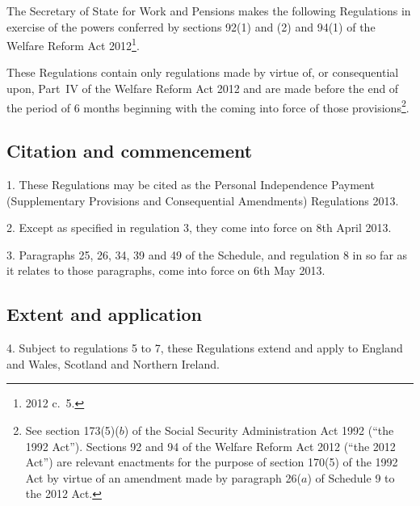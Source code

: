 \documentclass[12pt,a4paper]{article}
\title{\regstitle}
\author{S.I.\ 2013 No.\ 388}
\date{Made
25th February 2013\\
Laid before Parliament
4th March 2013\\
Coming into force
in accordance with regulations 2 and 3
}
\begin{document}
\maketitle


\noindent
The Secretary of State for Work and Pensions makes the following Regulations in exercise of the powers conferred by sections 92(1) and (2) and 94(1) of the Welfare Reform Act 2012\footnote{2012 c.~5.}.

These Regulations contain only regulations made by virtue of, or consequential upon, Part~IV of the Welfare Reform Act 2012 and are made before the end of the period of 6 months beginning with the coming into force of those provisions\footnote{See section 173(5)($b$)  of the Social Security Administration Act 1992 (“the 1992 Act”). Sections 92 and 94 of the Welfare Reform Act 2012 (“the 2012 Act”) are relevant enactments for the purpose of section 170(5) of the 1992 Act by virtue of an amendment made by paragraph 26($a$)  of Schedule 9 to the 2012 Act.}. 

{\sloppy

\tableofcontents

}

\bigskip

\setcounter{secnumdepth}{-2}

\subsection[1--3. Citation and commencement]{Citation and commencement}

1.  These Regulations may be cited as the Personal Independence Payment (Supplementary Provisions and Consequential Amendments) Regulations 2013.

\medskip

2.  Except as specified in regulation 3, they come into force on 8th April 2013.

\medskip

3.  Paragraphs 25, 26, 34, 39 and 49 of the Schedule, and regulation 8 in so far as it relates to those paragraphs, come into force on 6th May 2013.

\subsection[4--7. Extent and application]{Extent and application}

4.  Subject to regulations 5 to 7, these Regulations extend and apply to England and Wales, Scotland and Northern Ireland.
\end{document}
